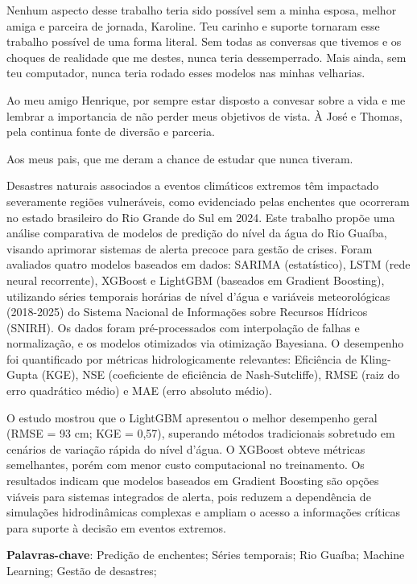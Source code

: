 \documentclass[
	12pt,				%
	openright,			%
	twoside,			%
	a4paper,			%
	english,			%
	french,				%
	spanish,			%
  japanese,
	brazil				%
	]{abntex2}
\begin{document}
\begin{agradecimentos}
Nenhum aspecto desse trabalho teria sido possível sem a minha esposa, melhor amiga e parceira de jornada, Karoline. Teu carinho e suporte tornaram esse trabalho possível de uma forma literal. Sem todas as conversas que tivemos e os choques de realidade que me destes, nunca teria dessemperrado. Mais ainda, sem teu computador, nunca teria rodado esses modelos nas minhas velharias.

Ao meu amigo Henrique, por sempre estar disposto a convesar sobre a vida e me lembrar a importancia de não perder meus objetivos de vista. À José e Thomas, pela continua fonte de diversão e parceria.   

Aos meus pais, que me deram a chance de estudar que nunca tiveram.

\end{agradecimentos}


\newpage

\setlength{\absparsep}{18pt} %
\begin{resumo}[Resumo]
Desastres naturais associados a eventos climáticos extremos têm impactado severamente regiões vulneráveis, como
evidenciado pelas enchentes que ocorreram no estado brasileiro do Rio Grande do Sul em 2024. Este trabalho propõe uma
análise comparativa de modelos de predição do nível da água do Rio Guaíba, visando aprimorar sistemas de alerta
precoce para gestão de crises. Foram avaliados quatro modelos baseados em dados: SARIMA (estatístico), LSTM (rede
neural recorrente), XGBoost e LightGBM (baseados em Gradient Boosting), utilizando séries temporais horárias de nível
d'água e variáveis meteorológicas (2018-2025) do Sistema Nacional de Informações sobre Recursos Hídricos (SNIRH). Os
dados foram pré-processados com interpolação de falhas e normalização, e os modelos otimizados via otimização
Bayesiana. O desempenho foi quantificado por métricas hidrologicamente relevantes: Eficiência de Kling-Gupta (KGE), NSE
(coeficiente de eficiência de Nash-Sutcliffe), RMSE (raiz do erro quadrático médio) e MAE (erro absoluto médio).

O estudo mostrou que o LightGBM apresentou o melhor desempenho geral (RMSE = 93 cm; KGE = 0,57), superando métodos
tradicionais sobretudo em cenários de variação rápida do nível d’água. O XGBoost obteve métricas semelhantes, porém com
menor custo computacional no treinamento. Os resultados indicam que modelos baseados em Gradient Boosting são opções
viáveis para sistemas integrados de alerta, pois reduzem a dependência de simulações hidrodinâmicas complexas e ampliam
o acesso a informações críticas para suporte à decisão em eventos extremos.
   
\vspace{\onelineskip}

\textbf{Palavras-chave}: Predição de enchentes; Séries temporais; Rio Guaíba; Machine Learning; Gestão de desastres;
\end{resumo}
\end{document}
